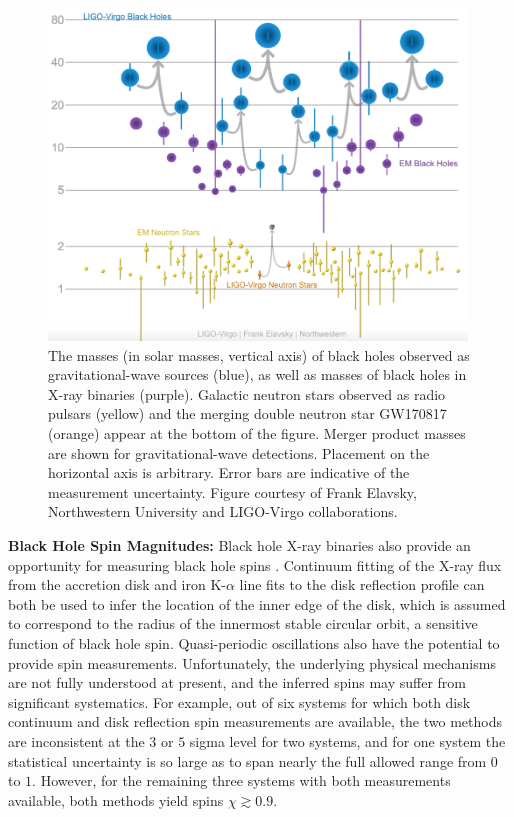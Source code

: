 \documentclass[iop,onecolumn]{revtex4-1}
\begin{document}
\begin{figure}
	\centering
	\includegraphics[width=0.99\textwidth]{Graveyard.png}
	\caption{\label{fig:BHmasses}  The masses (in solar masses, vertical axis) of black holes observed as gravitational-wave sources (blue), as well as masses of black holes in X-ray binaries (purple).  Galactic neutron stars observed as radio pulsars (yellow) and the merging double neutron star GW170817 (orange) appear at the bottom of the figure.  Merger product masses are shown for gravitational-wave detections. Placement on the horizontal axis is arbitrary.  Error bars are indicative of the measurement uncertainty.  Figure courtesy of Frank Elavsky, Northwestern University and LIGO-Virgo collaborations.}
\end{figure}


\textbf{Black Hole Spin Magnitudes:} Black hole X-ray binaries also provide an opportunity for measuring black hole spins \citep[see][for a recent review]{MillerMiller:2015}.  Continuum fitting of the X-ray flux from the accretion disk and iron K-$\alpha$ line fits to the disk reflection profile can both be used to infer the location of the inner edge of the disk, which is assumed to correspond to the radius of the innermost stable circular orbit, a sensitive function of black hole spin.  Quasi-periodic oscillations also have the potential to provide spin measurements.  Unfortunately, the underlying physical mechanisms are not fully understood at present, and the inferred spins may suffer from significant systematics.  For example, out of six systems for which both disk continuum and disk reflection spin measurements are available, the two methods are inconsistent at the $3$ or $5$ sigma level for two systems, and for one system the statistical uncertainty is so large as to span nearly the full allowed range from $0$ to $1$.  However, for the remaining three systems with both measurements available, both methods yield spins $\chi \gtrsim 0.9$.  
\end{document}
